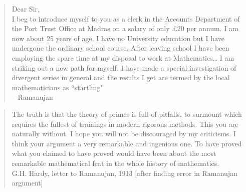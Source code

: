 \documentclass[11pt]{article}
\begin{document}
\begin{quote}
Dear Sir,
\\  I beg to introduce myself to you as a clerk in the Accounts Department
of the Port Trust Office at Madras on a salary of only \pounds 20 per
annum.  I am now about 25 years of age.  I have no University education but
I have undergone the ordinary school course.  After leaving school I have
been employing the spare time at my disposal to work at Mathematics\ldots
I am striking out a new path for myself.  I have made a special investigation
of divergent series in general and the results I get are termed
by the local mathematicians as ``startling"  \\ -- Ramanujan
\end{quote}

\begin{quote}
The truth is that the theory of primes is full of pitfalls, to surmount which requires the 
fullest of trainings in modern rigorous methods. This you are naturally without. I hope 
you will not be discouraged by my criticisms. I think your argument a very remarkable 
and ingenious one. To have proved what you claimed to have proved would have been
 about the most remarkable mathematical feat in the whole history of mathematics.
\\ G.H. Hardy, letter to Ramanujan, 1913 [after finding error in Ramanujan argument]
\end{quote}
\end{document}
